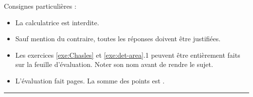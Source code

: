 
\def\arraystretch{1}
\setlength\tabcolsep{10pt}

\SetDate[20/03/2026]
\reversemarginpar
\setlength{\marginparsep}{.5cm}


\pagestyle{fancy}
\fancyhead[R]{\today}

\null\vspace{-20pt}
Consignes particulières : 
\begin{itemize}[label=$\bullet$]
	\item 
	La calculatrice est {interdite}.
	\item
	Sauf mention du contraire, toutes les réponses doivent être justifiées.
	\item
	Les exercices \ref{exe:Chasles} et \ref{exe:det-area}.1 peuvent être entièrement faits sur la feuille d'évaluation.
	Noter son nom avant de rendre le sujet.
	\item
	L'évaluation fait \pageref{lastpage} pages. La somme des points est .
\end{itemize}

\marginpar{[pts]}
\hrule


